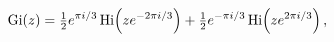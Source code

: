 \[\mathop{\mathrm{Gi}\/}\nolimits\!\left(z\right)=\tfrac{1}{2}e^{\pi i/3}\mathop%
{\mathrm{Hi}\/}\nolimits\!\left(ze^{-2\pi i/3}\right)+\tfrac{1}{2}e^{-\pi i/3}%
\mathop{\mathrm{Hi}\/}\nolimits\!\left(ze^{2\pi i/3}\right),\]